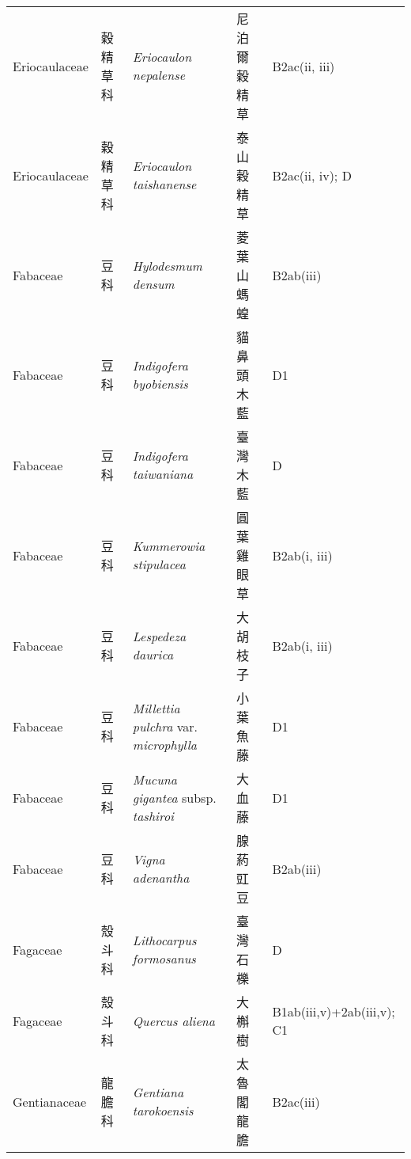 {\begin{longtable}{p{2.5cm}p{2.5cm}p{4.5cm}p{2.5cm}p{3cm}}
    Eriocaulaceae & 穀精草科 & \textit{Eriocaulon nepalense}  & 尼泊爾穀精草 & B2ac(ii, iii) \index{Eriocaulon@\textit{Eriocaulon}!nepalense@\textit{nepalense}}  \index{尼泊爾穀精草} \\
    Eriocaulaceae & 穀精草科 & \textit{Eriocaulon taishanense}  & 泰山穀精草 & B2ac(ii, iv); D \index{Eriocaulon@\textit{Eriocaulon}!taishanense@\textit{taishanense}}  \index{泰山穀精草} \\
    Fabaceae & 豆科 & \textit{Hylodesmum densum}  & 菱葉山螞蝗 & B2ab(iii) \index{Hylodesmum@\textit{Hylodesmum}!densum@\textit{densum}}  \index{菱葉山螞蝗} \\
    Fabaceae & 豆科 & \textit{Indigofera byobiensis}  & 貓鼻頭木藍 & D1 \index{Indigofera@\textit{Indigofera}!byobiensis@\textit{byobiensis}}  \index{貓鼻頭木藍} \\
    Fabaceae & 豆科 & \textit{Indigofera taiwaniana}  & 臺灣木藍 & D \index{Indigofera@\textit{Indigofera}!taiwaniana@\textit{taiwaniana}}  \index{臺灣木藍} \\
    Fabaceae & 豆科 & \textit{Kummerowia stipulacea}  & 圓葉雞眼草 & B2ab(i, iii) \index{Kummerowia@\textit{Kummerowia}!stipulacea@\textit{stipulacea}}  \index{圓葉雞眼草} \\
    Fabaceae & 豆科 & \textit{Lespedeza daurica}  & 大胡枝子 & B2ab(i, iii) \index{Lespedeza@\textit{Lespedeza}!daurica@\textit{daurica}}  \index{大胡枝子} \\
    Fabaceae & 豆科 & \textit{Millettia pulchra} var. \textit{microphylla}  & 小葉魚藤 & D1 \index{Millettia@\textit{Millettia}!pulchra@\textit{pulchra}!var. microphylla@var. \textit{microphylla}}  \index{小葉魚藤} \\
    Fabaceae & 豆科 & \textit{Mucuna gigantea} subsp. \textit{tashiroi}  & 大血藤 & D1 \index{Mucuna@\textit{Mucuna}!gigantea@\textit{gigantea}!subsp. tashiroi@subsp. \textit{tashiroi}}  \index{大血藤} \\
    Fabaceae & 豆科 & \textit{Vigna adenantha}  & 腺葯豇豆 & B2ab(iii) \index{Vigna@\textit{Vigna}!adenantha@\textit{adenantha}}  \index{腺葯豇豆} \\
    Fagaceae & 殼斗科 & \textit{Lithocarpus formosanus}  & 臺灣石櫟 & D \index{Lithocarpus@\textit{Lithocarpus}!formosanus@\textit{formosanus}}  \index{臺灣石櫟} \\
    Fagaceae & 殼斗科 & \textit{Quercus aliena}  & 大槲樹 & B1ab(iii,v)+2ab(iii,v); C1 \index{Quercus@\textit{Quercus}!aliena@\textit{aliena}}  \index{大槲樹} \\
    Gentianaceae & 龍膽科 & \textit{Gentiana tarokoensis}  & 太魯閣龍膽 & B2ac(iii) \index{Gentiana@\textit{Gentiana}!tarokoensis@\textit{tarokoensis}}  \index{太魯閣龍膽} \\

\end{longtable}}
